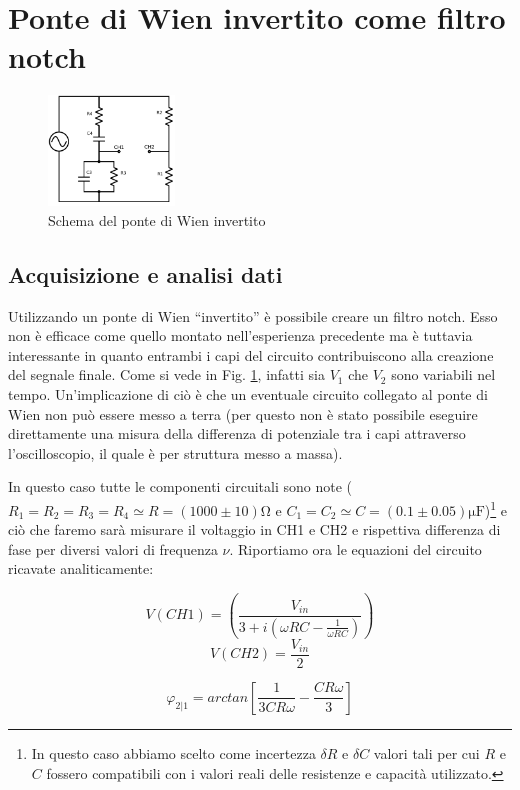 \section{Ponte di Wien invertito come filtro notch}

\begin{figure}
	\centering
    \includegraphics[width=0.30\textwidth]{schema2.pdf}
    \caption{Schema del ponte di Wien invertito}
    \label{fig:Winv}
\end{figure}

\subsection{Acquisizione e analisi dati}
Utilizzando un ponte di Wien ``invertito'' è possibile creare un filtro notch. Esso non è efficace come quello montato nell'esperienza precedente ma è tuttavia interessante in quanto entrambi i capi del circuito contribuiscono alla creazione del segnale finale. Come si vede in Fig. \ref{fig:Winv}, infatti sia $V_1$ che $V_2$ sono variabili nel tempo. Un'implicazione di ciò è che un eventuale circuito collegato al ponte di Wien non può essere messo a terra (per questo non è stato possibile eseguire direttamente una misura della differenza di potenziale tra i capi attraverso l'oscilloscopio, il quale è per struttura messo a massa).

In questo caso tutte le componenti circuitali sono note ($R_1 = R_2 = R_3 = R_4 \simeq R = (1000 \pm 10)\si{\ohm}$ e $C_1 = C_2 \simeq C = (0.1 \pm 0.05)\si{\micro\farad}$)\footnote{In questo caso abbiamo scelto come incertezza $\delta R$ e $\delta C$ valori tali per cui $R$ e $C$ fossero compatibili con i valori reali delle resistenze e capacità utilizzato.} e ciò che faremo sarà misurare il voltaggio in CH1 e CH2 e rispettiva differenza di fase per diversi valori di frequenza $\nu$. Riportiamo ora le equazioni del circuito ricavate analiticamente: 

\noindent
\begin{minipage}{.5\linewidth}
\begin{equation}
V(CH1) = \left(\frac{V_{in}}{3+i(\omega R C - \frac{1}{\omega R C})}\right)
\label{eq:V1}
\end{equation}
\begin{equation}
V(CH2) = \frac{V_{in}}{2}
\label{eq:V(CH2)}
\end{equation}
\end{minipage}%
\begin{minipage}{.5\linewidth}
\begin{equation}
\varphi_{2|1}=arctan\left[\frac{1}{3 C R \omega}-\frac{C R \omega}{3}\right]
\label{eq:F12}
\end{equation}
\end{minipage}\break

